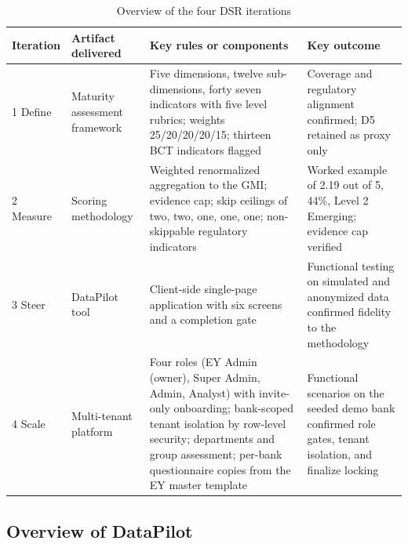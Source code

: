 \begin{table}[H]
\centering
\caption{Overview of the four DSR iterations}
\label{tab:iterations-overview}
{\footnotesize
\setlength{\tabcolsep}{4pt}
\begin{tabular}{|p{1.8cm}|p{3.0cm}|p{5.4cm}|p{4.2cm}|}
\hline
\textbf{Iteration} & \textbf{Artifact delivered} & \textbf{Key rules or components} & \textbf{Key outcome} \\
\hline
1 Define & Maturity assessment framework & Five dimensions, twelve sub-dimensions, forty seven indicators with five level rubrics; weights 25/20/20/20/15; thirteen BCT indicators flagged & Coverage and regulatory alignment confirmed; D5 retained as proxy only \\
\hline
2 Measure & Scoring methodology & Weighted renormalized aggregation to the GMI; evidence cap; skip ceilings of two, two, one, one, one; non-skippable regulatory indicators & Worked example of 2.19 out of 5, 44\%, Level 2 Emerging; evidence cap verified \\
\hline
3 Steer & DataPilot tool & Client-side single-page application with six screens and a completion gate & Functional testing on simulated and anonymized data confirmed fidelity to the methodology \\
\hline
4 Scale & Multi-tenant platform & Four roles (EY Admin (owner), Super Admin, Admin, Analyst) with invite-only onboarding; bank-scoped tenant isolation by row-level security; departments and group assessment; per-bank questionnaire copies from the EY master template & Functional scenarios on the seeded demo bank confirmed role gates, tenant isolation, and finalize locking \\
\hline
\end{tabular}
}
\end{table}

\subsection{Overview of DataPilot}

